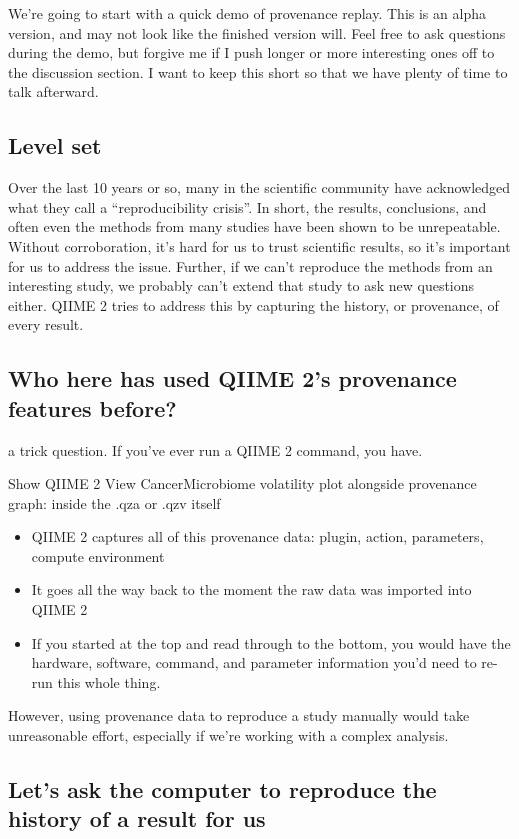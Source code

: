 We’re going to start with a quick demo of provenance replay. This is an alpha
version, and may not look like the finished version will. Feel free to ask
questions during the demo, but forgive me if I push longer or more interesting
ones off to the discussion section. I want to keep this short so that we have
plenty of time to talk afterward.

\subsection*{Level set}

Over the last 10 years or so, many in the scientific community have acknowledged
what they call a “reproducibility crisis”. In short, the results, conclusions,
and often even the methods from many studies have been shown to be unrepeatable.
Without corroboration, it’s hard for us to trust scientific results, so it’s
important for us to address the issue. Further, if we can’t reproduce the
methods from an interesting study, we probably can’t extend that study to ask
new questions either. QIIME 2 tries to address this by capturing the history, or
provenance, of every result.

\subsection*{Who here has used QIIME 2’s provenance features before?}

\noindent a trick question. If you’ve ever run a QIIME 2 command, you have.

\noindent Show QIIME 2 View CancerMicrobiome volatility plot alongside provenance graph:
inside the .qza or .qzv itself
\begin{itemize}
    \item QIIME 2 captures all of this provenance data: plugin, action, parameters, compute environment
    \item It goes all the way back to the moment the raw data was imported into QIIME 2
    \item If you started at the top and read through to the bottom, you would have the hardware, software, command, and parameter information you'd need to re-run this whole thing.
\end{itemize}

\noindent However, using provenance data to reproduce a study manually would take
unreasonable effort, especially if we’re working with a complex analysis.

\subsection*{Let’s ask the computer to reproduce the history of a result for us}

